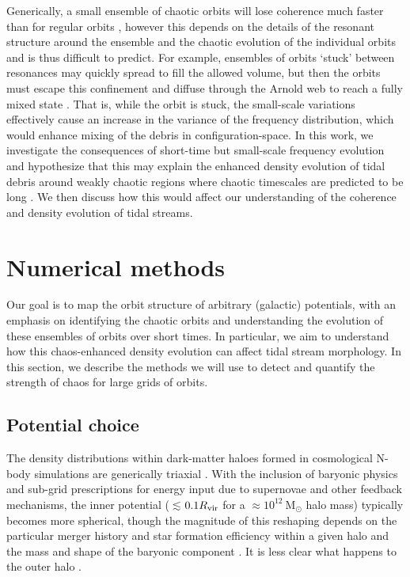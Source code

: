 \documentclass[letterpaper,12pt,preprint]{aastex}
\newcommand{\msun}{\ensuremath{\mathrm{M}_\odot}}
\begin{document}
Generically, a small ensemble of chaotic orbits will lose coherence much faster than for regular orbits \cite[see, e.g.,][]{kandrup94, merritt96, kandrup03}, however this depends on the details of the resonant structure around the ensemble and the chaotic evolution of the individual orbits and is thus difficult to predict. For example, ensembles of orbits `stuck' between resonances may quickly spread to fill the allowed volume, but then the orbits must escape this confinement and diffuse through the Arnold web to reach a fully mixed state \citep{merritt96}. That is, while the orbit is stuck, the small-scale variations effectively cause an increase in the variance of the frequency distribution, which would enhance mixing of the debris in configuration-space. In this work, we investigate the consequences of short-time but small-scale frequency evolution and hypothesize that this may explain the enhanced density evolution of tidal debris around weakly chaotic regions where chaotic timescales are predicted to be long \citep[e.g.,][]{pearson15}. We then discuss how this would affect our understanding of the coherence and density evolution of tidal streams.

\section{Numerical methods}\label{sec:methods}

Our goal is to map the orbit structure of arbitrary (galactic) potentials, with an emphasis on identifying the chaotic orbits and understanding the evolution of these ensembles of orbits over short times. In particular, we aim to understand how this chaos-enhanced density evolution can affect tidal stream morphology. In this section, we describe the methods we will use to detect and quantify the strength of chaos for large grids of orbits.

\subsection{Potential choice}\label{sec:potential}

The density distributions within dark-matter haloes formed in cosmological N-body simulations are generically triaxial \citep[e.g.,][]{jing02, bett07, zemp09, veraciro11}. With the inclusion of baryonic physics and sub-grid prescriptions for energy input due to supernovae and other feedback mechanisms, the inner potential ($\lesssim$$0.1R_{\rm vir}$ for a $\approx$$10^{12}~\msun$ halo mass) typically becomes more spherical, though the magnitude of this reshaping depends on the particular merger history and star formation efficiency within a given halo and the mass and shape of the baryonic component \citep[e.g.,][though in Milky Way-like galaxies, baryonic disks will add non-sphericity to the total potential]{dubinski94,kazantzidis04, debattista08, bryan13, butsky15}. It is less clear what happens to the outer halo \citep[e.g.,][]{zemp11, valluri13}.
\end{document}
